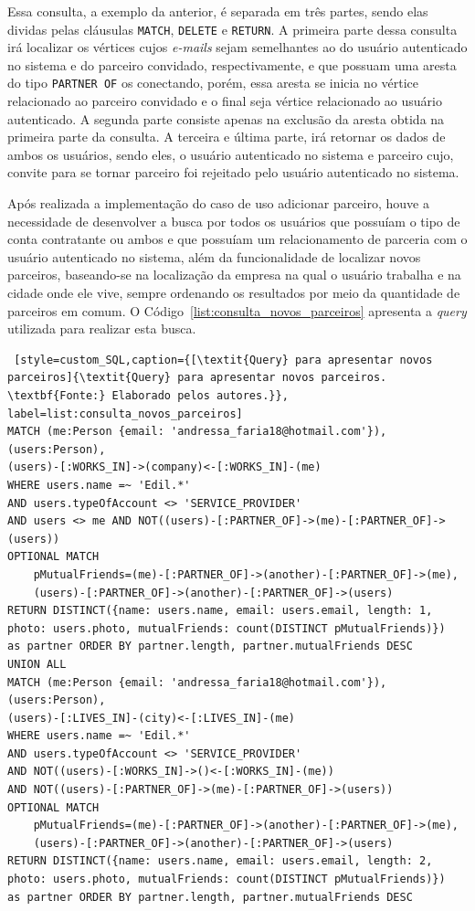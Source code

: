 \par Essa consulta, a exemplo da anterior, é separada em três partes, sendo elas dividas pelas cláusulas \texttt{MATCH}, \texttt{DELETE} e \texttt{RETURN}. A primeira parte dessa consulta irá localizar os vértices cujos \textit{e-mails} sejam semelhantes ao do usuário autenticado no sistema e do parceiro convidado, respectivamente, e que possuam uma aresta do tipo \texttt{PARTNER OF} os conectando, porém, essa aresta se inicia no vértice relacionado ao parceiro convidado e o final seja vértice relacionado ao usuário autenticado. A segunda parte consiste apenas na exclusão da aresta obtida na primeira parte da consulta. A terceira e última parte, irá retornar os dados de ambos os usuários, sendo eles, o usuário autenticado no sistema e parceiro cujo, convite para se tornar parceiro foi rejeitado pelo usuário autenticado no sistema.

\par Após realizada a implementação do caso de uso adicionar parceiro, houve a necessidade de desenvolver a busca por todos os usuários que possuíam o tipo de conta contratante ou ambos e que possuíam um relacionamento de parceria com o usuário autenticado no sistema, além da funcionalidade de localizar novos parceiros, baseando-se na localização da empresa na qual o usuário trabalha e na cidade onde ele vive, sempre ordenando os resultados por meio da quantidade de parceiros em comum. O Código~\ref{list:consulta_novos_parceiros} apresenta a \textit{query} utilizada para realizar esta busca.

\begin{lstlisting} [style=custom_SQL,caption={[\textit{Query} para apresentar novos parceiros]{\textit{Query} para apresentar novos parceiros. \textbf{Fonte:} Elaborado pelos autores.}}, label=list:consulta_novos_parceiros] 	
MATCH (me:Person {email: 'andressa_faria18@hotmail.com'}), (users:Person),
(users)-[:WORKS_IN]->(company)<-[:WORKS_IN]-(me)
WHERE users.name =~ 'Edil.*'
AND users.typeOfAccount <> 'SERVICE_PROVIDER'
AND users <> me AND NOT((users)-[:PARTNER_OF]->(me)-[:PARTNER_OF]->(users))  
OPTIONAL MATCH 
	pMutualFriends=(me)-[:PARTNER_OF]->(another)-[:PARTNER_OF]->(me), 
	(users)-[:PARTNER_OF]->(another)-[:PARTNER_OF]->(users) 
RETURN DISTINCT({name: users.name, email: users.email, length: 1, 
photo: users.photo, mutualFriends: count(DISTINCT pMutualFriends)}) 
as partner ORDER BY partner.length, partner.mutualFriends DESC 
UNION ALL 
MATCH (me:Person {email: 'andressa_faria18@hotmail.com'}), (users:Person),
(users)-[:LIVES_IN]-(city)<-[:LIVES_IN]-(me)
WHERE users.name =~ 'Edil.*'
AND users.typeOfAccount <> 'SERVICE_PROVIDER' 
AND NOT((users)-[:WORKS_IN]->()<-[:WORKS_IN]-(me)) 
AND NOT((users)-[:PARTNER_OF]->(me)-[:PARTNER_OF]->(users)) 
OPTIONAL MATCH 
	pMutualFriends=(me)-[:PARTNER_OF]->(another)-[:PARTNER_OF]->(me), 
	(users)-[:PARTNER_OF]->(another)-[:PARTNER_OF]->(users) 
RETURN DISTINCT({name: users.name, email: users.email, length: 2, 
photo: users.photo, mutualFriends: count(DISTINCT pMutualFriends)})
as partner ORDER BY partner.length, partner.mutualFriends DESC
\end{lstlisting}

